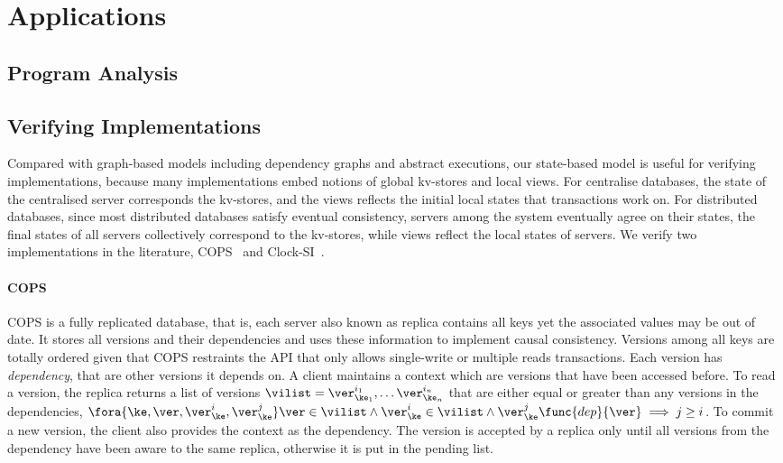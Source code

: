 \section{Applications}
\label{sec:applications}

\subsection{Program Analysis}

\subsection{Verifying Implementations}
Compared with graph-based models including dependency graphs and abstract executions,
our state-based model is useful for verifying implementations,
because many implementations embed notions of global kv-stores and local views.
For centralise databases, the state of the centralised server corresponds the kv-stores,
and the views reflects the initial local states that transactions work on.
For distributed databases, since most distributed databases satisfy eventual consistency, 
\ie servers among the system eventually agree on their states,
the final states of all servers collectively correspond to the kv-stores,
while views reflect the local states of servers.
We verify two implementations in the literature, 
COPS~\cite{Lloyd:2011:DSE:2043556.2043593} and Clock-SI~\cite{Du:2013:CSI:2553409.2553434}.

\paragraph{\bf COPS}
COPS is a fully replicated database, that is, 
each server also known as replica contains all keys yet the associated values may be out of date.
It stores all versions and their dependencies and uses these information to implement causal consistency.
Versions among all keys are totally ordered given that
COPS restraints the API that only allows single-write or multiple reads transactions.
Each version has \emph{dependency}, that are other versions it depends on.
A client maintains a context which are versions that have been accessed before.
To read a version, the replica returns a list of versions \( \vilist = \ver^{i_1}_{\ke_1}, \dots \ver^{i_n}_{\ke_n} \) 
that are either equal or greater than any versions in the dependencies,
\ie \( \fora{\ke, \ver, \ver^{i}_{\ke}, \ver^{j}_{\ke}} \ver \in \vilist \land \ver^{i}_{\ke} \in \vilist \land \ver^{j}_{\ke} \func{dep}{\ver} \implies j \geq i \).
To commit a new version, the client also provides the context as the dependency.
The version is accepted by a replica
only until all versions from the dependency have been aware to the same replica,
otherwise it is put in the pending list.

